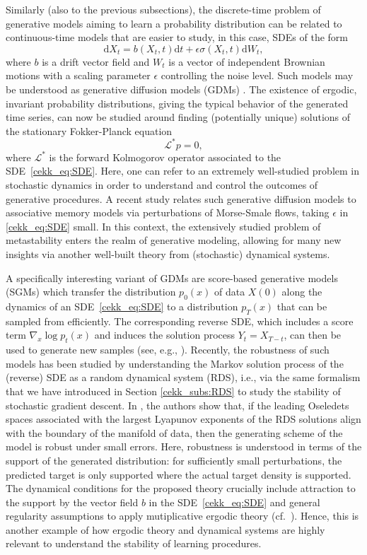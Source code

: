 \documentclass[10pt]{article}
\begin{document}
Similarly (also to the previous subsections), the discrete-time problem of generative models aiming to learn a probability distribution can be related to continuous-time models that are easier to study, in this case, SDEs of the form
\begin{equation}
\label{cekk_eq:SDE}
\text{d} X_t = b(X_t, t) \text{d} t + \epsilon \sigma(X_t, t) \text{d} W_t,
\end{equation} 
where $b$ is a drift vector field and $W_t$ is a vector of independent Brownian motions with a scaling parameter $\epsilon$ controlling the noise level. Such models may be understood as generative diffusion models (GDMs) \cite{Caoetal}. The existence of ergodic, invariant probability distributions, giving the typical behavior of the generated time series, can now be studied around finding (potentially unique) solutions of the stationary Fokker-Planck equation
$$ \mathcal L^* p = 0,$$
where $\mathcal{L}^*$ is the forward Kolmogorov operator associated to the SDE~\eqref{cekk_eq:SDE}.
Here, one can refer to an extremely well-studied problem in stochastic dynamics in order to understand and control the outcomes of generative procedures. 
A recent study \cite{HessMorris} relates such generative diffusion models to associative memory models via perturbations of Morse-Smale flows, taking $\epsilon$ in \eqref{cekk_eq:SDE} small.
In this context, the extensively studied problem of metastability \cite{BovierdenHollander} enters the realm of generative modeling, allowing for many new insights via another well-built theory from (stochastic) dynamical systems.

A specifically interesting variant of GDMs are score-based generative models (SGMs) which transfer the distribution $p_0(x)$ of data $X(0)$ along the dynamics of an SDE~\eqref{cekk_eq:SDE} to a distribution $p_T(x)$ that can be sampled from efficiently. The corresponding reverse SDE, which includes a score term $\nabla_x \log p_t(x)$ and induces the solution process $Y_t = X_{T-t}$, can then be used to generate new samples (see, e.g., \cite{Songetal}).
Recently, the robustness of such models has been studied by understanding the Markov solution process of the (reverse) SDE as a random dynamical system (RDS), i.e., via the same formalism that we have introduced in Section \ref{cekk_subs:RDS} to study the stability of stochastic gradient descent. In \cite{ChandramoorthyDeClercq}, the authors show that, if the leading Oseledets spaces associated with the largest Lyapunov exponents of the RDS solutions align with the boundary of the manifold of data, then the generating scheme of the model is robust under small errors. Here, robustness is understood in terms of the support of the generated distribution: for sufficiently small perturbations, the predicted target is only supported where the actual target density is supported. The dynamical conditions for the proposed theory crucially include attraction to the support by the vector field $b$ in the SDE~\eqref{cekk_eq:SDE} and general regularity assumptions to apply mutiplicative ergodic theory (cf.~\cite{Arnold98}). Hence, this is another example of how ergodic theory and dynamical systems are highly relevant to understand the stability of learning procedures.
\end{document}
